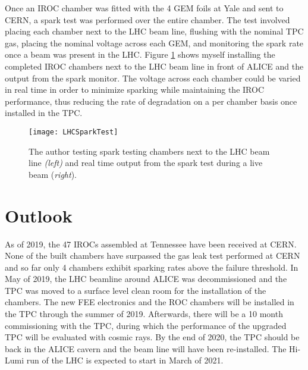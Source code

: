Once an IROC chamber was fitted with the 4 GEM foils at Yale and sent to CERN, a spark test was performed over the entire chamber.  The test involved placing each chamber next to the LHC beam line, flushing with the nominal TPC gas, placing the nominal voltage across each GEM, and monitoring the spark rate once a beam was present in the LHC.   Figure \ref{fig:LHCspark} shows myself installing the completed IROC chambers next to the LHC beam line in front of ALICE and the output from the spark monitor.  The voltage across each chamber could be varied in real time in order to minimize sparking while maintaining the IROC performance, thus reducing the rate of degradation on a per chamber basis once installed in the TPC.




\begin{figure}[h]
\texttt{[image: LHCSparkTest]}
\centering
\caption{The author testing spark testing chambers next to the LHC beam line \textit{(left)} and real time output from the spark test during a live beam (\textit{right}). }
\label{fig:LHCspark}
\end{figure}





\section{Outlook}

As of 2019, the 47 IROCs assembled at Tennessee have been received at CERN.  None of the built chambers have surpassed the gas leak test performed at CERN and so far only 4 chambers exhibit sparking rates above the failure threshold.  In May of 2019, the LHC beamline around ALICE was decommissioned and the TPC was moved to a surface level clean room for the installation of the chambers.  The new FEE electronics and the ROC chambers will be installed in the TPC through the summer of 2019.  Afterwards, there will be a 10 month commissioning with the TPC, during which the performance of the upgraded TPC will be evaluated with cosmic rays.  By the end of 2020, the TPC should be back in the ALICE cavern and the beam line will have been re-installed.  The Hi-Lumi run of the LHC is expected to start in March of 2021.





